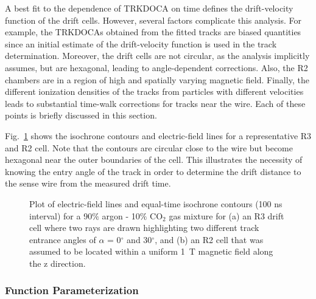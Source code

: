 A best fit to the dependence of TRKDOCA on time defines the 
drift-velocity function of the drift cells. However, several factors 
complicate this analysis. For example, the TRKDOCAs obtained from the fitted 
tracks are biased quantities since an initial estimate of the drift-velocity 
function is used in the track determination.  Moreover, the drift cells are 
not circular, as the analysis implicitly assumes, but are hexagonal, leading 
to angle-dependent corrections.   Also, the R2 chambers are in a 
region of high and spatially varying magnetic field.  Finally, the different 
ionization densities of the tracks from particles with different velocities 
leads to substantial time-walk corrections for tracks near the wire.  Each of 
these points is briefly discussed in this section.

Fig.~\ref{garfield-isochrones} shows the isochrone contours and electric-field lines for 
a representative R3 and R2 cell.  Note that the contours are circular close 
to the wire but become hexagonal near the outer boundaries of the cell.  This 
illustrates the necessity of knowing the entry angle of the track in order to 
determine the drift distance to the sense wire from the measured drift time.

\begin{figure}[htpb]
\vspace{8cm} 
\caption{\small{Plot of electric-field lines and equal-time isochrone contours
(100 ns interval) for a 90$\%$ argon - 10$\%$ CO$_2$ gas mixture for (a) an R3
drift cell where two rays are drawn highlighting two different track entrance 
angles of $\alpha$ = 0$^{\circ}$ and 30$^{\circ}$, and (b) an R2 cell that 
was assumed to be located within a uniform 1~T magnetic field along the z 
direction.}}
\label{garfield-isochrones}
\end{figure}

\subsubsection{Function Parameterization}
\label{funcpar} 

